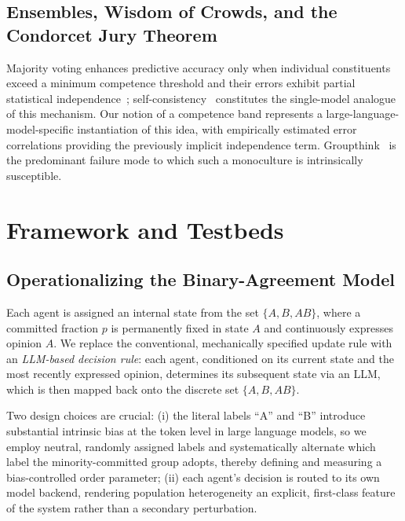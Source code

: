 \documentclass[manuscript,screen,review]{acmart}
\begin{document}
\subsection{Ensembles, Wisdom of Crowds, and the Condorcet Jury Theorem}
Majority voting enhances predictive accuracy only when individual constituents exceed a minimum competence threshold and their errors exhibit partial statistical independence~\cite{condorcet}; self-consistency~\cite{wang2023selfconsistency} constitutes the single-model analogue of this mechanism. Our notion of a competence band represents a large-language-model-specific instantiation of this idea, with empirically estimated error correlations providing the previously implicit independence term. Groupthink~\cite{janis1972} is the predominant failure mode to which such a monoculture is intrinsically susceptible.

\section{Framework and Testbeds}
\subsection{Operationalizing the Binary-Agreement Model}
\label{sec:opmodel}
Each agent is assigned an internal state from the set $\{A, B, AB\}$, where a committed fraction $p$ is permanently fixed in state $A$ and continuously expresses opinion $A$. We replace the conventional, mechanically specified update rule with an \emph{LLM-based decision rule}: each agent, conditioned on its current state and the most recently expressed opinion, determines its subsequent state via an LLM, which is then mapped back onto the discrete set $\{A,B,AB\}$.

Two design choices are crucial: (i) the literal labels “A” and “B” introduce substantial intrinsic bias at the token level in large language models, so we employ neutral, randomly assigned labels and systematically alternate which label the minority-committed group adopts, thereby defining and measuring a bias-controlled order parameter; (ii) each agent’s decision is routed to its own model backend, rendering population heterogeneity an explicit, first-class feature of the system rather than a secondary perturbation.
\end{document}
